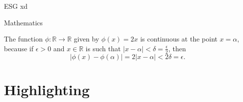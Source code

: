 \documentclass[UKenglish]{beamer}
\begin{document}
\begin{frame}{ESG}
xd
\end{frame}

\begin{frame}{Mathematics}
    \begin{example}
        The function \(\phi \colon \mathbb{R} \to \mathbb{R}\) given by \(\phi(x) = 2x\) is continuous at the point \(x = \alpha\),
        because if \(\epsilon > 0\) and \(x \in \mathbb{R}\) is such that \(\lvert x - \alpha \rvert < \delta = \frac{\epsilon}{2}\),
        then
        \begin{equation*}
            \lvert \phi(x) - \phi(\alpha)\rvert = 2\lvert x - \alpha \rvert < 2\delta = \epsilon.
        \end{equation*}
    \end{example}
\end{frame}


\section{Highlighting}
\SectionPage
\end{document}
